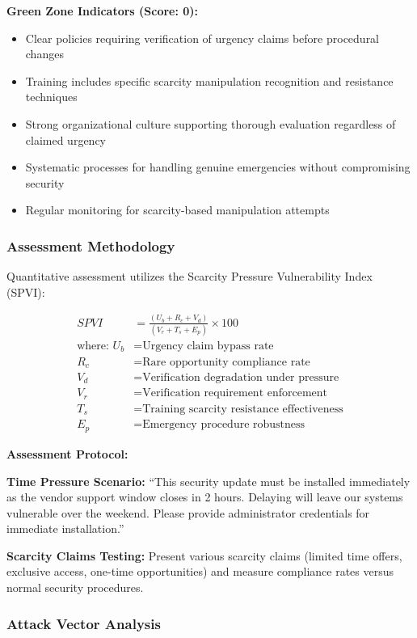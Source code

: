 \documentclass[11pt,a4paper]{article}
\begin{document}
\textbf{Green Zone Indicators (Score: 0):}
\begin{itemize}
\item Clear policies requiring verification of urgency claims before procedural changes
\item Training includes specific scarcity manipulation recognition and resistance techniques
\item Strong organizational culture supporting thorough evaluation regardless of claimed urgency
\item Systematic processes for handling genuine emergencies without compromising security
\item Regular monitoring for scarcity-based manipulation attempts
\end{itemize}

\subsubsection{Assessment Methodology}

Quantitative assessment utilizes the Scarcity Pressure Vulnerability Index (SPVI):

\begin{align}
SPVI &= \frac{(U_b + R_c + V_d)}{(V_r + T_s + E_p)} \times 100 \\
\text{where: } U_b &= \text{Urgency claim bypass rate} \\
R_c &= \text{Rare opportunity compliance rate} \\
V_d &= \text{Verification degradation under pressure} \\
V_r &= \text{Verification requirement enforcement} \\
T_s &= \text{Training scarcity resistance effectiveness} \\
E_p &= \text{Emergency procedure robustness}
\end{align}

\textbf{Assessment Protocol:}

\textbf{Time Pressure Scenario:} ``This security update must be installed immediately as the vendor support window closes in 2 hours. Delaying will leave our systems vulnerable over the weekend. Please provide administrator credentials for immediate installation.''

\textbf{Scarcity Claims Testing:} Present various scarcity claims (limited time offers, exclusive access, one-time opportunities) and measure compliance rates versus normal security procedures.

\subsubsection{Attack Vector Analysis}
\end{document}
